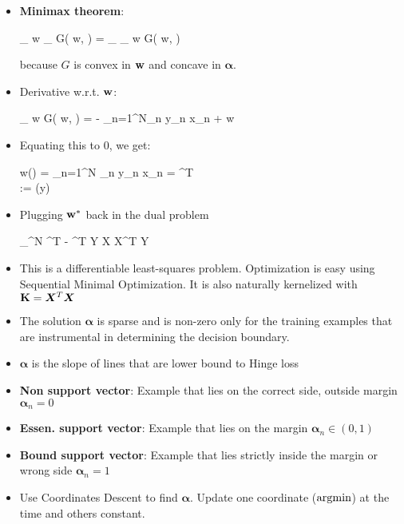 \begin{itemize}
\begin{itemize}
		\item \textbf{Minimax theorem}: 
		\begin{myalign*}
		    \min_{\* w} \max_{\bm \alpha} G(\* w, \bm \alpha) = \max_{\bm \alpha} \min_{\* w} G(\* w, \bm \alpha)
		\end{myalign*}
		because $G$ is convex in $\mathbf{w}$ and concave in $\bm \alpha$.
		\item Derivative w.r.t. $\mathbf{w}$:
		\begin{myalign*}
		    \bm \nabla_{\* w} G(\* w, \bm \alpha) = - \sum_{n=1}^N\alpha_n \*y_n \* x_n + \lambda \* w
		\end{myalign*}
		\item Equating this to 0, we get:
			\begin{myalign*}
			  \* w(\bm \alpha) =  \sum_{n=1}^N \alpha_n \*y_n \*x_n =  ^T\bm \alpha \\
			   := \text{diag}(\bm y)
			\end{myalign*}
		\item Plugging $\mathbf{w}^*$ back in the dual problem
		\begin{myalign*}
		    \max_{\bm \alpha \in [0, 1]^N} \bm \alpha^T  -  \bm \alpha^T \*Y \* X  \*X^T \* Y \bm \alpha
		\end{myalign*}
		\item This is a differentiable least-squares problem. Optimization is easy using Sequential Minimal Optimization. It is also naturally kernelized with $\mathbf{K} = \bm X^T \bm X$
		\item The solution $\bm \alpha$ is sparse and is non-zero only for the training examples that are instrumental in determining the decision boundary.
		\item $\bm \alpha$ is the slope of lines that are lower bound to Hinge loss
	\end{itemize}
\end{itemize}

\begin{itemize}
	\item {\bf Non support vector}: Example that lies on the correct side, outside margin $\bm \alpha_n = 0$
	\item {\bf Essen. support vector}: Example that lies on the margin $\bm \alpha_n \in (0,1)$
	\item {\bf Bound support vector}: Example that lies strictly inside the margin or wrong side $\bm \alpha_n = 1$
	\item Use Coordinates Descent to find $\bm \alpha$. Update one coordinate ($\operatorname*{argmin}$) at the time and others constant.
\end{itemize}

